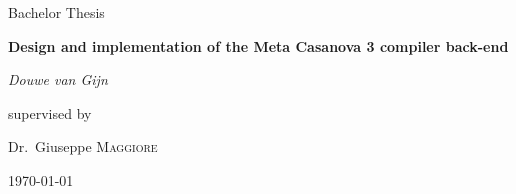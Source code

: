 \documentclass[12pt,a4paper]{report}
\begin{document}
\begin{titlepage}
	\centering
	{\Large Bachelor Thesis\par}
        \vspace{2cm}
	       {\huge\bfseries Design and implementation of the Meta Casanova 3 compiler back-end \par}
	\vfill
	{\Large\itshape Douwe van Gijn\par}
	\vfill
	supervised by\par
	Dr.~Giuseppe \textsc{Maggiore}
	\vfill
	{\large \today\par}
\end{titlepage}
\end{document}
